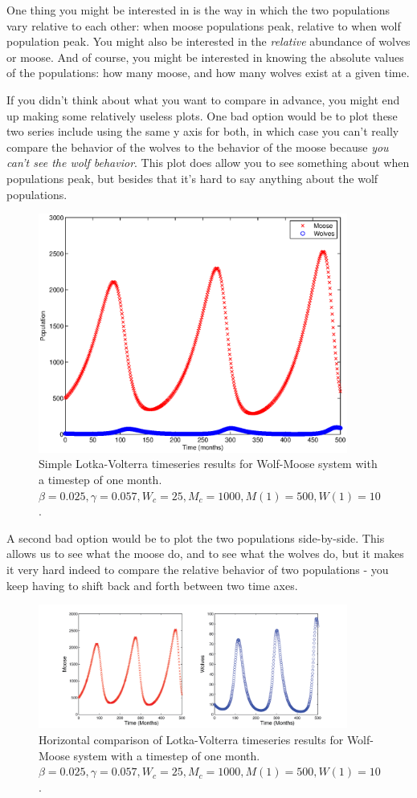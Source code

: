 One thing you might be interested in is the way in which the two populations vary relative to each other:  when moose populations peak, relative to when wolf population peak.  You might also be interested in the {\it relative} abundance of wolves or moose.  And of course, you might be interested in knowing the absolute values of the populations:  how many moose, and how many wolves exist at a given time.

If you didn't think about what you want to compare in advance, you might end up making some relatively useless plots.  One bad option would be to plot these two series include using the same y axis for both, in which case you can't really compare the behavior of the wolves to the behavior of the moose because {\it you can't see the wolf behavior}.   This plot does allow you to see something about when populations peak, but besides that it's hard to say anything about the wolf populations.

\begin{figure}[h!]
\includegraphics[width=4in]{figs/WolfMooseTimeSeries}
\caption{Simple Lotka-Volterra timeseries results for Wolf-Moose system with a timestep of one month.  $\beta = 0.025, \gamma = 0.057, W_c = 25, M_c=1000, M(1) = 500, W(1) = 10$.}
\end{figure}

A second bad option would be to plot the two populations side-by-side.  This allows us to see what the moose do, and to see what the wolves do, but it makes it very hard indeed to compare the relative behavior of two populations - you keep having to shift back and forth between two time axes.

\begin{figure}[h!]
\includegraphics[width=4in]{figs/WolfMooseTimeSeriesHorizontal}
\caption{Horizontal comparison of Lotka-Volterra timeseries results for Wolf-Moose system with a timestep of one month.  $\beta = 0.025, \gamma = 0.057, W_c = 25, M_c=1000, M(1) = 500, W(1) = 10$.}
\end{figure}

